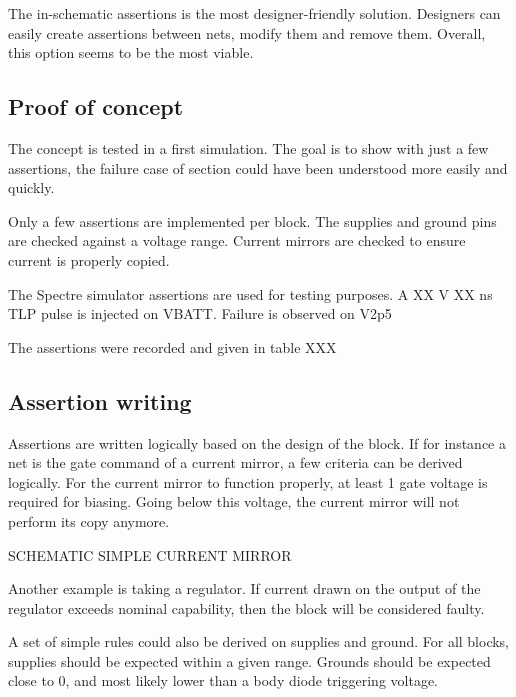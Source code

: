 The in-schematic assertions is the most designer-friendly solution.
Designers can easily create assertions between nets, modify them and remove them.
Overall, this option seems to be the most viable.

\subsection{Proof of concept}

The concept is tested in a first simulation.
The goal is to show with just a few assertions, the failure case of section \label{sec:failure-case-study} could have been understood more easily and quickly.

Only a few assertions are implemented per block.
The supplies and ground pins are checked against a voltage range.
Current mirrors are checked to ensure current is properly copied.

The Spectre simulator assertions are used for testing purposes.
A XX V XX ns TLP pulse is injected on VBATT.
Failure is observed on V2p5

The assertions were recorded and given in table XXX



\subsection{Assertion writing}

Assertions are written logically based on the design of the block.
If for instance a net is the gate command of a current mirror, a few criteria can be derived logically.
For the current mirror to function properly, at least 1 gate voltage is required for biasing.
Going below this voltage, the current mirror will not perform its copy anymore.

SCHEMATIC SIMPLE CURRENT MIRROR

Another example is taking a regulator.
If current drawn on the output of the regulator exceeds nominal capability, then the block will be considered faulty.

A set of simple rules could also be derived on supplies and ground.
For all blocks, supplies should be expected within a given range.
Grounds should be expected close to 0, and most likely lower than a body diode triggering voltage.

